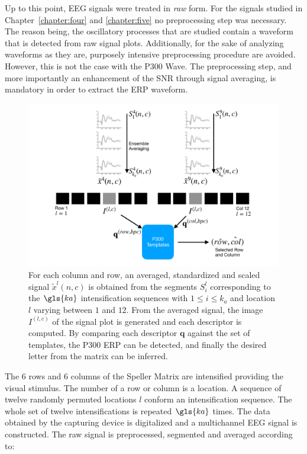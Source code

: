 Up to this point, EEG signals were treated in \textit{raw} form.  For the signals studied in Chapter~\ref{chapter:four} and \ref{chapter:five} no preprocessing step was necessary. The reason being, the oscillatory processes that are studied contain a waveform that is detected from raw signal plots.  Additionally, for the sake of analyzing waveforms as they are, purposely intensive preprocessing procedure are avoided.  However, this is not the case with the P300 Wave.  The preprocessing step, and more importantly an enhancement of the SNR through signal averaging, is mandatory in order to extract the ERP waveform.

\begin{figure}[htb]
\centering
\includegraphics[width=15cm]{images/classificationgraph.pdf}
\caption[P300 Speller Matrix Letter Identification]{For each column and row, an averaged, standardized and scaled signal $\tilde{x}^l(n,c)$ is obtained from the segments $S_i^l$  corresponding to the $\gls{ka}$ intensification sequences with $ 1 \leq i \leq k_a $ and location $l$ varying between $1$ and $12$. From the averaged signal, the image $I^{(l,c)}$ of the signal plot is generated and each descriptor is computed.  By comparing each descriptor $\mathbf{q}$  against the set of templates, the P300 ERP can be detected, and finally the desired letter from the matrix can be inferred.}
\label{fig:classification}
\end{figure}

The $6$ rows and $6$ columns of the Speller Matrix are intensified providing the visual stimulus.  The number of a row or column is a location. A sequence of twelve randomly permuted locations $l$ conform an intensification sequence. The whole set of twelve intensifications is repeated $\gls{ka}$ times. The data obtained by the capturing device is digitalized and a multichannel EEG signal is constructed.  The raw signal is preprocessed, segmented and averaged according to:

